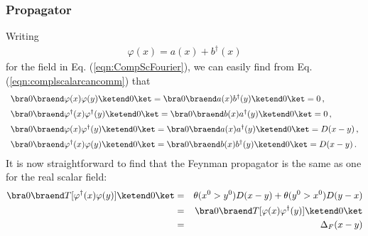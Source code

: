 \subsubsection{Propagator}
Writing
\begin{eqnarray}
\varphi(x) = a(x) + b^\dagger(x)
\end{eqnarray}
for the field  in Eq. (\ref{eqn:CompScFourier}),
we can easily find from Eq. (\ref{eqn:complscalarcancomm}) that
\begin{eqnarray}
\begin{array}{l}
\bra 0 \braend \varphi(x) \varphi(y) \ketend 0 \ket = 
\bra 0 \braend a(x) b^\dagger(y) \ketend 0 \ket = 0\,,
\vspace{2mm}
\\
\bra 0 \braend \varphi^\dagger(x) \varphi^\dagger(y) \ketend 0 \ket = 
\bra 0 \braend b(x) a^\dagger(y) \ketend 0 \ket = 0\,,
\vspace{2mm}
\\
\bra 0 \braend \varphi(x) \varphi^\dagger(y) \ketend 0 \ket = 
\bra 0 \braend a(x) a^\dagger(y) \ketend 0 \ket = D(x-y)\,,
\vspace{2mm}
\\
\bra 0 \braend \varphi^\dagger(x) \varphi(y) \ketend 0 \ket = 
\bra 0 \braend b(x) b^\dagger(y) \ketend 0 \ket = D(x-y)\,.
\end{array}
\label{eqn:CplxSc2ndOrdVEV}
\end{eqnarray}
It is now straightforward to find that the Feynman propagator is
the same as one for the real scalar field:
\begin{eqnarray}
\bra 0 \braend T[\varphi^\dagger(x) \varphi(y)] \ketend 0 \ket 
&=& 
\theta(x^0 > y^0) D(x-y) + \theta(y^0 > x^0) D(y - x)
\nonumber\\
&=&
\bra 0 \braend T[\varphi(x) \varphi^\dagger(y)] \ketend 0 \ket 
\nonumber\\
&=&
\Delta_F(x-y)
\label{eqn:CplxScProp}
\end{eqnarray}

